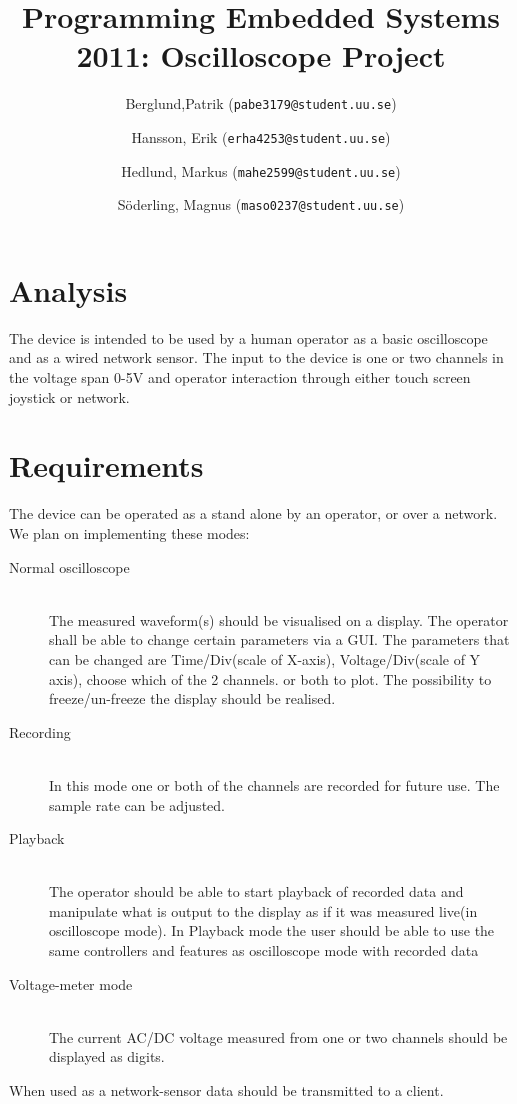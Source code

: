 \documentclass[a4paper]{report}
\title{Programming Embedded Systems 2011: Oscilloscope Project}
\author{
	Berglund,Patrik (\texttt{pabe3179@student.uu.se})
\and
	Hansson, Erik (\texttt{erha4253@student.uu.se})
\and
	Hedlund, Markus (\texttt{mahe2599@student.uu.se})
\and
	Söderling, Magnus (\texttt{maso0237@student.uu.se})
}
\begin{document}
\maketitle

\section*{Analysis}
The device is intended to be used by a human operator as a basic oscilloscope
and as a wired network sensor. The input to the device is one or two channels
in the voltage span 0-5V and operator interaction through either touch screen
joystick or network.

\section*{Requirements}
%
The device can be operated as a stand alone by an operator,
or over a network.
We plan on implementing these modes:
\begin{description}
\item[Normal oscilloscope] \ \\
The measured waveform(s) should be visualised on a display.
The operator shall be able to change certain parameters via a GUI.
The parameters that can be changed are Time/Div(scale of X-axis),
  Voltage/Div(scale of Y axis), choose which of the 2 channels.
  or both to plot.
The possibility to freeze/un-freeze the display should be realised.

\item[Recording] \ \\
In this mode one or both of the channels are recorded for future use.
The sample rate can be adjusted.  

\item[Playback] \ \\
The operator should be able to start playback of recorded data and manipulate
what is output to the display as if it was measured live(in oscilloscope mode).
In Playback mode the user should be able to use the same controllers and features 
as oscilloscope mode with recorded data

\item[Voltage-meter mode] \ \\
The current AC/DC voltage measured from one or two channels should be
displayed as digits.

\end{description}
When used as a network-sensor data should be transmitted to a client.
\end{document}
